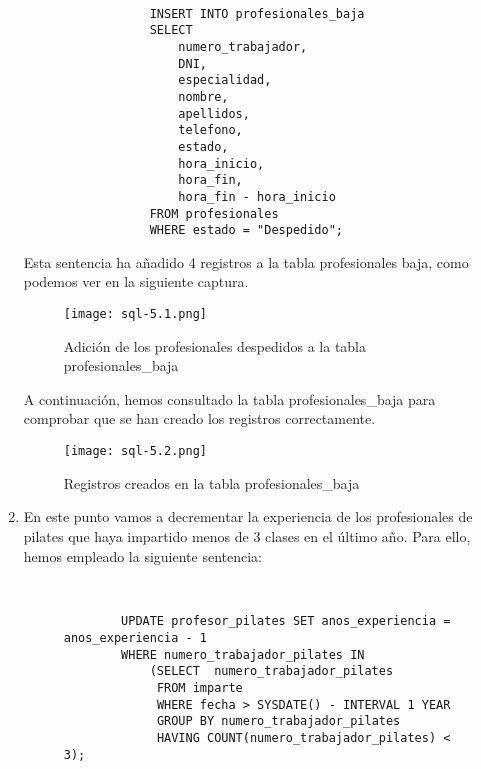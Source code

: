 \begin{enumerate}
    \begin{figure}[H]
        \begin{tcolorbox}[sharp corners, colback=yellow!30, colframe=white!20]
            \scriptsize
            \begin{verbatim}

            INSERT INTO profesionales_baja
            SELECT
                numero_trabajador,
                DNI,
                especialidad,
                nombre,
                apellidos,
                telefono,
                estado,
                hora_inicio,
                hora_fin,
                hora_fin - hora_inicio
            FROM profesionales
            WHERE estado = "Despedido";
            \end{verbatim}
        \end{tcolorbox}
    \end{figure}

    Esta sentencia ha añadido 4 registros a la tabla profesionales baja, como podemos ver en la siguiente captura.

    \begin{figure}[H]
        \centering
        \texttt{[image: sql-5.1.png]}
        \caption{Adición de los profesionales despedidos a la tabla profesionales\_baja}
    \end{figure}

    A continuación, hemos consultado la tabla profesionales\_baja para comprobar que se han creado los registros correctamente.

    \begin{figure}[H]
        \centering
        \texttt{[image: sql-5.2.png]}
        \caption{Registros creados en la tabla profesionales\_baja}
    \end{figure}

    \item En este punto vamos a decrementar la experiencia de los profesionales de pilates que haya impartido menos de 3 clases en el último año. Para ello, hemos empleado la siguiente sentencia:

        \begin{figure}[H]
        \begin{tcolorbox}[sharp corners, colback=yellow!30, colframe=white!20]
            \scriptsize
            \begin{verbatim}


        UPDATE profesor_pilates SET anos_experiencia = anos_experiencia - 1
        WHERE numero_trabajador_pilates IN
            (SELECT  numero_trabajador_pilates
             FROM imparte
             WHERE fecha > SYSDATE() - INTERVAL 1 YEAR
             GROUP BY numero_trabajador_pilates
             HAVING COUNT(numero_trabajador_pilates) < 3);
           \end{verbatim}
        \end{tcolorbox}
    \end{figure}


\end{enumerate}
